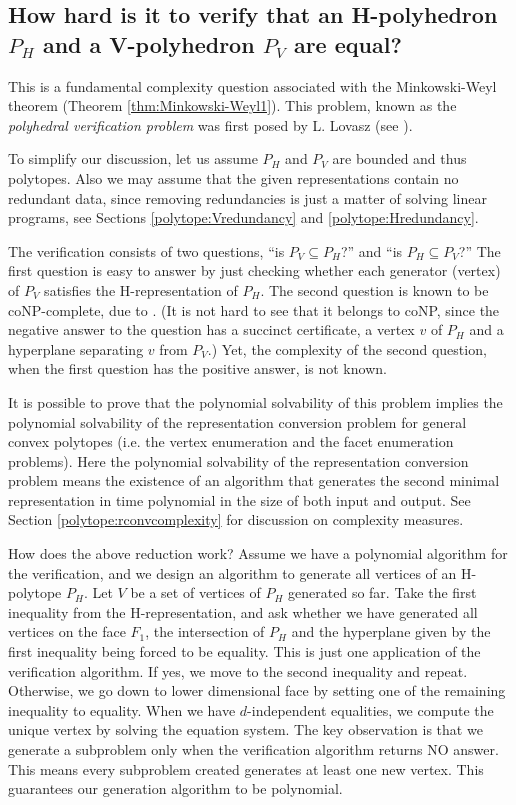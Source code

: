 \documentclass[[a4paper,12pt]{article}
\begin{document}
\subsection{How hard is it to verify that an H-polyhedron $P_H$ and
a V-polyhedron $P_V$ are equal?}
\label{polytope:verification}

This is a fundamental complexity question associated with
the Minkowski-Weyl theorem (Theorem \ref{thm:Minkowski-Weyl1}).
This problem, known as the {\em polyhedral verification problem\/}
 was first posed by L. Lovasz (see \cite{s-nhg-94}).

To simplify our discussion, let us assume $P_H$ and $P_V$ are
bounded and thus polytopes.  Also we may assume that the given
representations contain no redundant data, since removing
redundancies is just a matter of solving linear programs, see
Sections \ref{polytope:Vredundancy} and \ref{polytope:Hredundancy}.

The verification consists of two questions,
``is $P_V \subseteq P_H$?'' and ``is $P_H \subseteq P_V$?''
The first question is easy to answer by just checking
whether each generator (vertex) of $P_V$ 
satisfies the H-representation of $P_H$.
The second question is known to be coNP-complete, due to \cite{fo-ocfpsc-85}.
(It is not hard to see that it belongs to coNP, since the negative answer
to the question
has a succinct certificate, a vertex $v$ of $P_H$ and a hyperplane
separating $v$ from $P_V$.)
Yet, the complexity of the second question, when the first question has
the positive answer, is not known. 

It is possible
to prove that the polynomial solvability of this problem implies 
the polynomial solvability of the representation conversion problem
for general convex polytopes
(i.e. the vertex enumeration and the facet enumeration problems).
Here the polynomial solvability of the representation conversion
problem means the existence of an algorithm that generates
the second minimal representation in time polynomial in
the size of both input and output.  See Section \ref{polytope:rconvcomplexity} for discussion on complexity measures.

How does the above reduction work? 
Assume we have a polynomial algorithm for the verification,
and we design an algorithm to generate all vertices of
an H-polytope $P_H$.  
Let $V$ be a set of vertices of $P_H$
generated so far.
Take the first inequality from the H-representation,
and ask whether we have generated all vertices on
the face $F_1$, the intersection of $P_H$ and
the hyperplane given by the first inequality being
forced to be equality.   This is just one application
of the verification algorithm.  If yes, we move to
the second inequality and repeat.  Otherwise, we go
down to lower dimensional face by setting one of
the remaining inequality to equality.  When we have
$d$-independent equalities, we compute the unique vertex
by solving the equation system.  The key observation
is that we generate a subproblem only when the verification
algorithm returns NO answer.   This means every subproblem
created generates at least one new vertex.  This guarantees
our generation algorithm to be polynomial.
\end{document}
